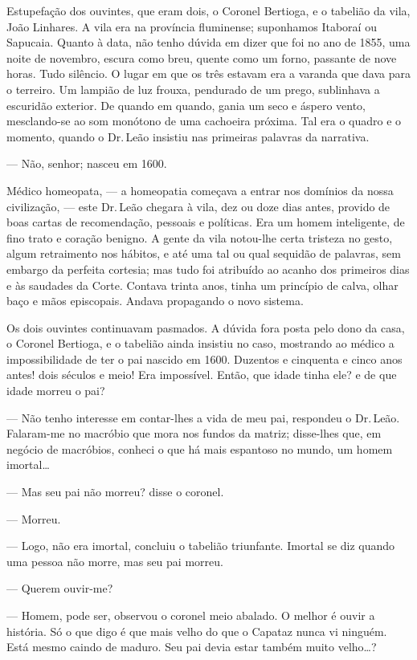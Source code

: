 Estupefação dos ouvintes, que eram dois, o Coronel Bertioga, e o
tabelião da vila, João Linhares. A vila era na província fluminense;
suponhamos Itaboraí ou Sapucaia. Quanto à data, não tenho dúvida em
dizer que foi no ano de 1855, uma noite de novembro, escura como breu,
quente como um forno, passante de nove horas. Tudo silêncio. O lugar em
que os três estavam era a varanda que dava para o terreiro. Um lampião
de luz frouxa, pendurado de um prego, sublinhava a escuridão exterior.
De quando em quando, gania um seco e áspero vento, mesclando-se ao som
monótono de uma cachoeira próxima. Tal era o quadro e o momento, quando
o Dr.\,Leão insistiu nas primeiras palavras da narrativa.

--- Não, senhor; nasceu em 1600.

Médico homeopata, --- a homeopatia começava a entrar nos domínios da
nossa civilização, --- este Dr.\,Leão chegara à vila, dez ou doze dias
antes, provido de boas cartas de recomendação, pessoais e políticas. Era
um homem inteligente, de fino trato e coração benigno. A gente da vila
notou-lhe certa tristeza no gesto, algum retraimento nos hábitos, e até
uma tal ou qual sequidão de palavras, sem embargo da perfeita cortesia;
mas tudo foi atribuído ao acanho dos primeiros dias e às saudades da
Corte. Contava trinta anos, tinha um princípio de calva, olhar baço e
mãos episcopais. Andava propagando o novo sistema.

Os dois ouvintes continuavam pasmados. A dúvida fora posta pelo dono da
casa, o Coronel Bertioga, e o tabelião ainda insistiu no caso, mostrando
ao médico a impossibilidade de ter o pai nascido em 1600. Duzentos e
cinquenta e cinco anos antes! dois séculos e meio! Era impossível.
Então, que idade tinha ele? e de que idade morreu o pai?

--- Não tenho interesse em contar-lhes a vida de meu pai, respondeu o
Dr.\,Leão. Falaram-me no macróbio que mora nos fundos da matriz;
disse-lhes que, em negócio de macróbios, conheci o que há mais espantoso
no mundo, um homem imortal\ldots{}

--- Mas seu pai não morreu? disse o coronel.

--- Morreu.

--- Logo, não era imortal, concluiu o tabelião triunfante. Imortal se
diz quando uma pessoa não morre, mas seu pai morreu.

--- Querem ouvir-me?

--- Homem, pode ser, observou o coronel meio abalado. O melhor é ouvir
a história. Só o que digo é que mais velho do que o Capataz nunca vi
ninguém. Está mesmo caindo de maduro. Seu pai devia estar também muito
velho\ldots{}?

